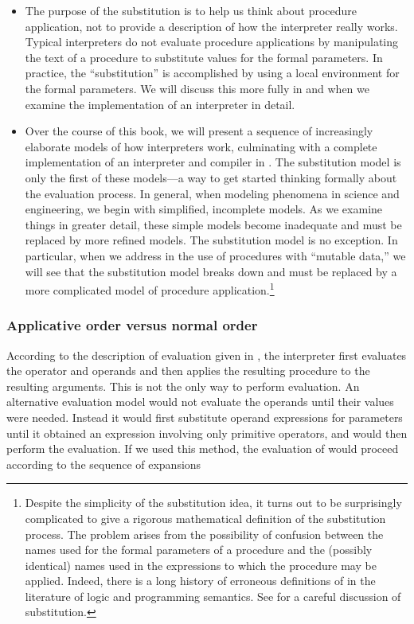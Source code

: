 \begin{itemize}

\item
The purpose of the substitution is to help us think about procedure
application, not to provide a description of how the interpreter really works.
Typical interpreters do not evaluate procedure applications by manipulating the
text of a procedure to substitute values for the formal parameters.  In
practice, the ``substitution'' is accomplished by using a local environment for
the formal parameters.  We will discuss this more fully in  and
 when we examine the implementation of an interpreter in detail.

\item
Over the course of this book, we will present a sequence of increasingly
elaborate models of how interpreters work, culminating with a complete
implementation of an interpreter and compiler in .  The
substitution model is only the first of these models---a way to get started
thinking formally about the evaluation process.  In general, when modeling
phenomena in science and engineering, we begin with simplified, incomplete
models.  As we examine things in greater detail, these simple models become
inadequate and must be replaced by more refined models.  The substitution model
is no exception.  In particular, when we address in  the use of
procedures with ``mutable data,'' we will see that the substitution model
breaks down and must be replaced by a more complicated model of procedure
application.\footnote{Despite the simplicity of the substitution idea, it turns
out to be surprisingly complicated to give a rigorous mathematical definition
of the substitution process.  The problem arises from the possibility of
confusion between the names used for the formal parameters of a procedure and
the (possibly identical) names used in the expressions to which the procedure
may be applied.  Indeed, there is a long history of erroneous definitions of
 in the literature of logic and programming semantics.
See  for a careful discussion of substitution.}

\end{itemize}

\subsubsection*{Applicative order versus normal order}

According to the description of evaluation given in , the
interpreter first evaluates the operator and operands and then applies the
resulting procedure to the resulting arguments.  This is not the only way to
perform evaluation.  An alternative evaluation model would not evaluate the
operands until their values were needed.  Instead it would first substitute
operand expressions for parameters until it obtained an expression involving
only primitive operators, and would then perform the evaluation.  If we used
this method, the evaluation of  would proceed according to the
sequence of expansions

